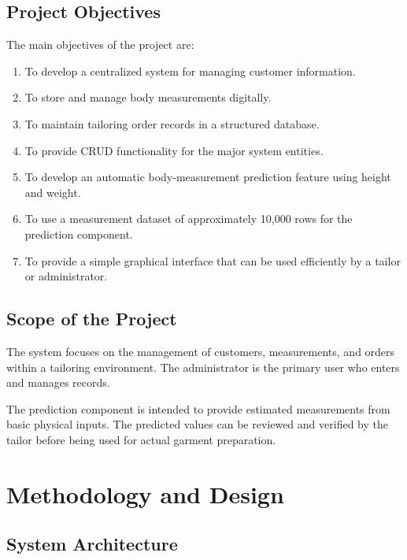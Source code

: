 \documentclass[12pt,a4paper]{report}
\begin{document}
\section{Project Objectives}

The main objectives of the project are:

\begin{enumerate}
  \item To develop a centralized system for managing customer information.
  \item To store and manage body measurements digitally.
  \item To maintain tailoring order records in a structured database.
  \item To provide CRUD functionality for the major system entities.
  \item To develop an automatic body-measurement prediction feature using
        height and weight.
  \item To use a measurement dataset of approximately 10,000 rows for the
        prediction component.
  \item To provide a simple graphical interface that can be used efficiently
        by a tailor or administrator.
\end{enumerate}

\section{Scope of the Project}

The system focuses on the management of customers, measurements, and orders
within a tailoring environment. The administrator is the primary user who
enters and manages records.

The prediction component is intended to provide estimated measurements from
basic physical inputs. The predicted values can be reviewed and verified by
the tailor before being used for actual garment preparation.


\chapter{Methodology and Design}

\section{System Architecture}
\end{document}
